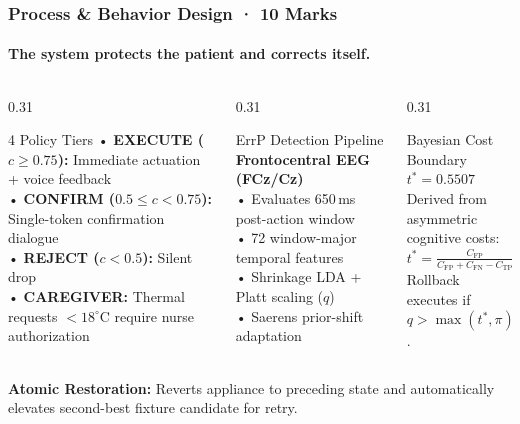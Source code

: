 \documentclass[aspectratio=169,10pt]{beamer}
\begin{document}
\begin{frame}
    \frametitle{Process & Behavior Design · 10 Marks}
    \framesubtitle{The system protects the patient and corrects itself.}
    \begin{columns}[T]
        \begin{column}{0.31\textwidth}
            \begin{block}{\small 4 Policy Tiers}
                \scriptsize
                • \textbf{EXECUTE ($c \ge 0.75$):} Immediate actuation + voice feedback\\
                • \textbf{CONFIRM ($0.5 \le c < 0.75$):} Single-token confirmation dialogue\\
                • \textbf{REJECT ($c < 0.5$):} Silent drop\\
                • \textbf{CAREGIVER:} Thermal requests $< 18^\circ$C require nurse authorization
            \end{block}
        \end{column}
        \begin{column}{0.31\textwidth}
            \begin{block}{\small ErrP Detection Pipeline}
                \scriptsize
                \textbf{Frontocentral EEG (FCz/Cz)}\\
                • Evaluates 650\,ms post-action window\\
                • 72 window-major temporal features\\
                • Shrinkage LDA + Platt scaling ($q$)\\
                • Saerens prior-shift adaptation
            \end{block}
        \end{column}
        \begin{column}{0.31\textwidth}
            \begin{block}{\small Bayesian Cost Boundary}
                \scriptsize
                \Large \textbf{\color{ForestGreen}$t^* = 0.5507$}\\
                \scriptsize Derived from asymmetric cognitive costs:\\
                $t^* = \frac{C_{\mathrm{FP}}}{C_{\mathrm{FP}} + C_{\mathrm{FN}} - C_{\mathrm{TP}}} = \frac{5}{5 + 7 - 2.92}$\\
                Rollback executes if $q > \max(t^*, \pi)$.
            \end{block}
        \end{column}
    \end{columns}
    \vspace{0.2cm}
    {\scriptsize \textbf{\color{ForestGreen}Atomic Restoration:} Reverts appliance to preceding state and automatically elevates second-best fixture candidate for retry.}
\end{frame}
\end{document}
